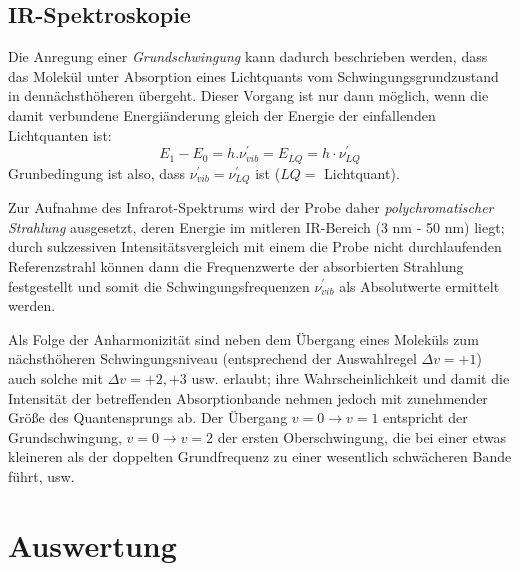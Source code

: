 \documentclass{article}
\begin{document}
\subsection{IR-Spektroskopie}
Die Anregung einer \textit{Grundschwingung} kann dadurch beschrieben werden,
dass das Molekül unter Absorption eines Lichtquants vom Schwingungsgrundzustand in dennächsthöheren übergeht.
Dieser Vorgang ist nur dann möglich, wenn die damit verbundene Energiänderung gleich der Energie der einfallenden Lichtquanten ist:
\begin{equation}
  E _1 - E_0 = h. \nu ^{'}_{vib} = E _{LQ} = h \cdot \nu ^{'}_{LQ}
\end{equation}
Grunbedingung ist also, dass $\nu ^{'}_{vib} = \nu ^{'}_{LQ} $ ist ($LQ =$ Lichtquant). \par
Zur Aufnahme des Infrarot-Spektrums wird der Probe daher \textit{polychromatischer Strahlung} ausgesetzt,
deren Energie im mitleren IR-Bereich (3 \si{\nano\meter} - 50 \si{\nano\meter}) liegt; durch sukzessiven
Intensitätsvergleich mit einem die Probe nicht durchlaufenden Referenzstrahl können dann die Frequenzwerte
der absorbierten Strahlung festgestellt und somit die Schwingungsfrequenzen $\nu ^{'}_{vib} $ als Absolutwerte
ermittelt werden. \par
Als Folge der Anharmonizität sind neben dem Übergang eines Moleküls zum nächsthöheren Schwingungsniveau
(entsprechend der Auswahlregel $ \Delta v = +1$) auch solche mit $ \Delta v = +2, +3$ usw. erlaubt;
ihre Wahrscheinlichkeit und damit die Intensität der betreffenden Absorptionbande nehmen
jedoch mit zunehmender Größe des Quantensprungs ab. Der Übergang $v =0 \rightarrow v =1$ entspricht der Grundschwingung,
$ v =0 \rightarrow v=2 $ der ersten Oberschwingung, die bei einer etwas kleineren als der doppelten Grundfrequenz
zu einer wesentlich schwächeren Bande führt, usw.
\section{Auswertung}


\printbibliography
\end{document}
